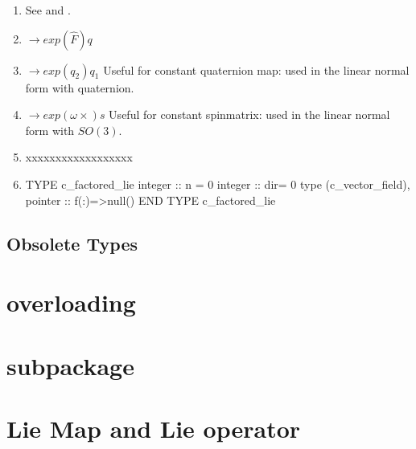 \documentclass[english,12pt,article]{article} %
\begin{document}
{{{\begin{enumerate}
\item  {}  See  and .

\item {} $\rightarrow exp\left({\widehat{F}}\right)q$

\item {} $\rightarrow exp\left({q_2}\right)q_1$ Useful for constant quaternion map: used in the linear normal form with quaternion.

\item {} $\rightarrow exp\left({\omega\times}\right)s$ Useful for constant spinmatrix: used in the linear normal form with $SO(3)$.

\item {}   



xxxxxxxxxxxxxxxxxx

\item {}

\begin{example}
TYPE c_factored_lie
      integer :: n = 0   
      integer :: dir= 0     
       type (c_vector_field), pointer :: f(:)=>null()                   
END TYPE c_factored_lie
\end{example}


\end{enumerate}
\subsection{Obsolete Types} 
\section{overloading}\label{sec:over}
\section{subpackage}\label{sec:subp}
\section{Lie Map and Lie operator}\label{sec:compo} 

}}}
\end{document}
